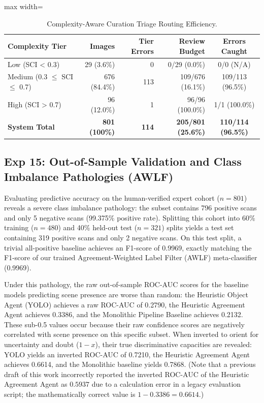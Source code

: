 \documentclass[11pt,a4paper]{article}
\begin{document}
\begin{table}[htbp]
\centering
\caption{Complexity-Aware Curation Triage Routing Efficiency.}
\label{tab:triage_routing_efficiency_handout}
\begin{adjustbox}{max width=\linewidth}
\begin{tabular}{lrrrc}
\toprule
\textbf{Complexity Tier} & \textbf{Images} & \textbf{Tier Errors} & \textbf{Review Budget} & \textbf{Errors Caught} \\
\midrule
Low (SCI < 0.3)         & 29 (3.6\%)   & 0   & 0/29 (0.0\%)     & 0/0 (N/A) \\
Medium (0.3 $\le$ SCI $\le$ 0.7) & 676 (84.4\%) & 113 & 109/676 (16.1\%) & 109/113 (96.5\%) \\
High (SCI > 0.7)        & 96 (12.0\%)  & 1   & 96/96 (100.0\%)  & 1/1 (100.0\%) \\
\midrule
\textbf{System Total}              & \textbf{801 (100\%)} & \textbf{114} & \textbf{205/801 (25.6\%)} & \textbf{110/114 (96.5\%)} \\
\bottomrule
\end{tabular}
\end{adjustbox}
\end{table}

\subsection{Exp 15: Out-of-Sample Validation and Class Imbalance Pathologies (AWLF)}
\label{sec:out_of_sample_awlf}
Evaluating predictive accuracy on the human-verified expert cohort ($n=801$) reveals a severe class imbalance pathology: the subset contains 796 positive scans and only 5 negative scans (99.375\% positive rate). Splitting this cohort into 60\% training ($n=480$) and 40\% held-out test ($n=321$) splits yields a test set containing 319 positive scans and only 2 negative scans. On this test split, a trivial all-positive baseline achieves an F1-score of 0.9969, exactly matching the F1-score of our trained Agreement-Weighted Label Filter (AWLF) meta-classifier (0.9969).

Under this pathology, the raw out-of-sample ROC-AUC scores for the baseline models predicting scene presence are worse than random: the Heuristic Object Agent (YOLO) achieves a raw ROC-AUC of 0.2790, the Heuristic Agreement Agent achieves 0.3386, and the Monolithic Pipeline Baseline achieves 0.2132. These sub-0.5 values occur because their raw confidence scores are negatively correlated with scene presence on this specific subset. When inverted to orient for uncertainty and doubt ($1 - x$), their true discriminative capacities are revealed: YOLO yields an inverted ROC-AUC of 0.7210, the Heuristic Agreement Agent achieves 0.6614, and the Monolithic baseline yields 0.7868. (Note that a previous draft of this work incorrectly reported the inverted ROC-AUC of the Heuristic Agreement Agent as $0.5937$ due to a calculation error in a legacy evaluation script; the mathematically correct value is $1 - 0.3386 = 0.6614$.)
\end{document}
